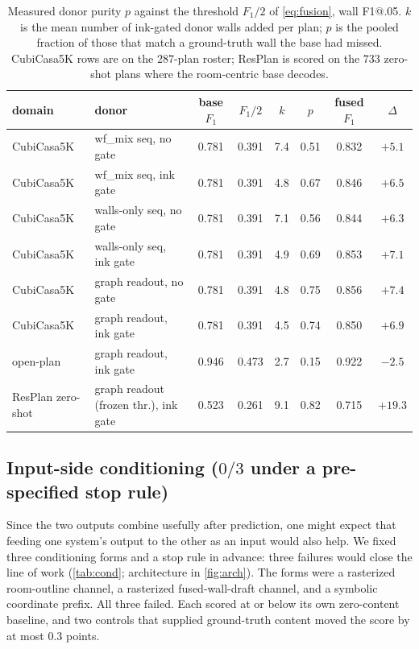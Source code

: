 \documentclass{article}
\begin{document}
\begin{table}[t]
\centering
\caption{Measured donor purity $p$ against the threshold $F_1/2$ of
\cref{eq:fusion}, wall F1@.05. $k$ is the mean number of ink-gated donor walls
added per plan; $p$ is the pooled fraction of those that match a ground-truth
wall the base had missed. CubiCasa5K rows are on the $287$-plan roster; ResPlan is
scored on the $733$ zero-shot plans where the room-centric base decodes.}
\label{tab:purity}
\small
\begin{tabular}{llcccccc}
\toprule
domain & donor & base $F_1$ & $F_1/2$ & $k$ & $p$ & fused $F_1$ & $\Delta$ \\
\midrule
CubiCasa5K & wf\_mix seq, no gate & 0.781 & 0.391 & 7.4 & 0.51 & 0.832 & $+5.1$ \\
CubiCasa5K & wf\_mix seq, ink gate & 0.781 & 0.391 & 4.8 & 0.67 & 0.846 & $+6.5$ \\
CubiCasa5K & walls-only seq, no gate & 0.781 & 0.391 & 7.1 & 0.56 & 0.844 & $+6.3$ \\
CubiCasa5K & walls-only seq, ink gate & 0.781 & 0.391 & 4.9 & 0.69 & 0.853 & $+7.1$ \\
CubiCasa5K & graph readout, no gate & 0.781 & 0.391 & 4.8 & 0.75 & 0.856 & $+7.4$ \\
CubiCasa5K & graph readout, ink gate & 0.781 & 0.391 & 4.5 & 0.74 & 0.850 & $+6.9$ \\
open-plan & graph readout, ink gate & 0.946 & 0.473 & 2.7 & 0.15 & 0.922 & $-2.5$ \\
ResPlan zero-shot & graph readout (frozen thr.), ink gate & 0.523 & 0.261 & 9.1 & 0.82 & 0.715 & $+19.3$ \\
\bottomrule
\end{tabular}
\end{table}

\subsection{Input-side conditioning (\texorpdfstring{$0/3$}{0/3} under a pre-specified stop rule)}\label{sec:cond}
Since the two outputs combine usefully after prediction, one might expect that
feeding one system's output to the other as an input would also help. We
fixed three conditioning forms and a stop rule in advance: three failures would
close the line of work (\cref{tab:cond}; architecture in \cref{fig:arch}). The
forms were a rasterized room-outline channel, a rasterized fused-wall-draft
channel, and a symbolic coordinate prefix. All three failed. Each scored at or
below its own zero-content baseline, and two controls that supplied
ground-truth content moved the score by at most $0.3$ points.
\end{document}

